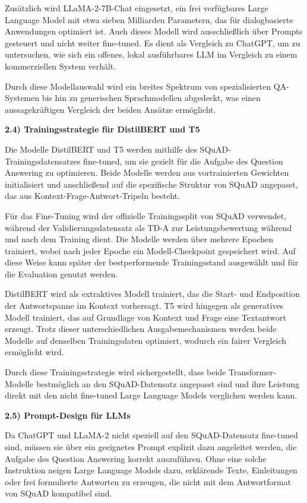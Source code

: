 \documentclass[12pt,oneside]{article}
\begin{document}
Zusätzlich wird LLaMA-2-7B-Chat \citep{touvron2023llama2} eingesetzt, ein frei verfügbares Large
Language Model mit etwa sieben Milliarden Parametern, das für
dialogbasierte Anwendungen optimiert ist. Auch dieses Modell wird
ausschließlich über Prompts gesteuert und nicht weiter fine-tuned. Es
dient als Vergleich zu ChatGPT, um zu untersuchen, wie sich ein offenes,
lokal ausführbares LLM im Vergleich zu einem kommerziellen System
verhält.

Durch diese Modellauswahl wird ein breites Spektrum von spezialisierten
QA-Systemen bis hin zu generischen Sprachmodellen abgedeckt, was einen
aussagekräftigen Vergleich der beiden Ansätze ermöglicht.

\textbf{2.4) Trainingsstrategie für DistilBERT und T5}

Die Modelle DistilBERT und T5 werden mithilfe des
SQuAD-Trainingsdatensatzes fine-tuned, um sie gezielt für die Aufgabe
des Question Answering zu optimieren. Beide Modelle werden aus
vortrainierten Gewichten initialisiert und anschließend auf die
spezifische Struktur von SQuAD angepasst, das aus
Kontext-Frage-Antwort-Tripeln besteht.

Für das Fine-Tuning wird der offizielle Trainingssplit von SQuAD
verwendet, während der Validierungsdatensatz als TD-A zur
Leistungsbewertung während und nach dem Training dient. Die Modelle
werden über mehrere Epochen trainiert, wobei nach jeder Epoche ein
Modell-Checkpoint gespeichert wird. Auf diese Weise kann später der
bestperformende Trainingsstand ausgewählt und für die Evaluation genutzt
werden.

DistilBERT wird als extraktives Modell trainiert, das die Start- und
Endposition der Antwortspanne im Kontext vorhersagt. T5 wird hingegen
als generatives Modell trainiert, das auf Grundlage von Kontext und
Frage eine Textantwort erzeugt. Trotz dieser unterschiedlichen
Ausgabemechanismen werden beide Modelle auf denselben Trainingsdaten
optimiert, wodurch ein fairer Vergleich ermöglicht wird.

Durch diese Trainingsstrategie wird sichergestellt, dass beide
Transformer-Modelle bestmöglich an den SQuAD-Datensatz angepasst sind
und ihre Leistung direkt mit den nicht fine-tuned Large Language Models
verglichen werden kann.

\textbf{2.5) Prompt-Design für LLMs}

Da ChatGPT und LLaMA-2 nicht speziell auf den SQuAD-Datensatz fine-tuned
sind, müssen sie über ein geeignetes Prompt explizit dazu angeleitet
werden, die Aufgabe des Question Answering korrekt auszuführen. Ohne
eine solche Instruktion neigen Large Language Models dazu, erklärende
Texte, Einleitungen oder frei formulierte Antworten zu erzeugen, die
nicht mit dem Antwortformat von SQuAD kompatibel sind.
\end{document}
